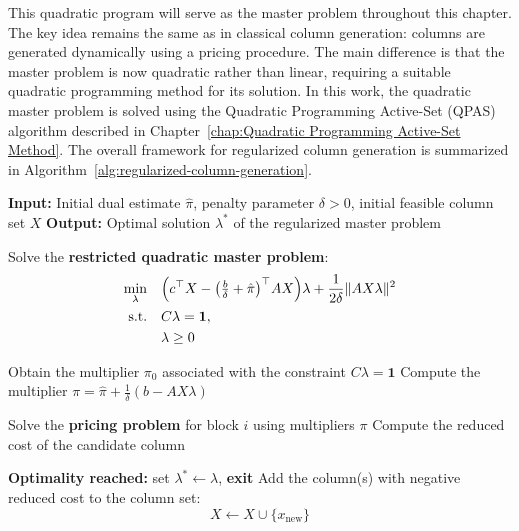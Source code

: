 \documentclass{book}
\theoremstyle{definition}
\newcounter{algorithm_}
\numberwithin{algorithm_}{chapter}
\newcommand{\alglabel}[1]{%
  \refstepcounter{algorithm_}%
  \label{#1}%
}
\begin{document}
This quadratic program will serve as the master problem throughout this chapter.  
The key idea remains the same as in classical column generation: columns are generated dynamically using a pricing procedure. The main difference is that the master problem is now quadratic rather than linear, requiring a suitable quadratic programming method for its solution. In this work, the quadratic master problem is solved using the Quadratic Programming Active-Set (QPAS) algorithm described in Chapter~\ref{chap:Quadratic Programming Active-Set Method}. The overall framework for regularized column generation is summarized in Algorithm~\ref{alg:regularized-column-generation}.

\bigskip

\medskip

\begin{tcolorbox}[colback=gray!10!white, colframe=gray!80!black,
                  title=Algorithm 4.1: Regularized Column Generation, sharp corners, boxrule=0.8pt]
{\small
\begin{algorithmic}[1]
\State \textbf{Input:} Initial dual estimate $\hat{\pi}$, penalty parameter $\delta > 0$, initial feasible column set $X$
\State \textbf{Output:} Optimal solution $\lambda^*$ of the regularized master problem

\Repeat

    \State Solve the \textbf{restricted quadratic master problem}:
	\[
		\begin{aligned}
			\min_{\lambda} \quad 
			& \Bigl(c^\top X - \bigl( \tfrac{b}{\delta} + \hat{\pi} \bigr)^\top A X \Bigr)\lambda
			+ \frac{1}{2\delta} \| A X \lambda \|^2 \\
			\text{s.t.} \quad 
			& C \lambda = \mathbf{1}, \\
			& \lambda \ge 0
		\end{aligned}
	\]

    \State Obtain the multiplier $\pi_0$ associated with the constraint $C\lambda = \mathbf{1}$
	\State Compute the multiplier $\pi = \hat{\pi} + \frac{1}{\delta}(b - AX\lambda)$

        \State Solve the \textbf{pricing problem} for block $i$ using multipliers $\pi$
        \State Compute the reduced cost of the candidate column
    \EndFor

        \State \textbf{Optimality reached:} set $\lambda^* \gets \lambda$, \textbf{exit}
    \Else
        \State Add the column(s) with negative reduced cost to the column set:
        \[
        X \gets X \cup \{x_{\text{new}}\}
        \]
    \EndIf


\end{algorithmic}
}
\end{tcolorbox}
\alglabel{alg:regularized-column-generation}
\end{document}
